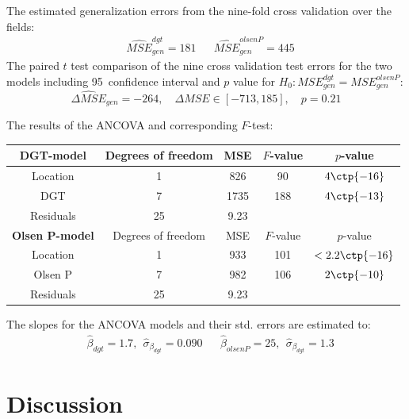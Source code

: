 \documentclass[11pt,fleqn]{article}
\begin{document}
The estimated generalization errors from the nine-fold cross validation over the fields:
\begin{align*}
	& \widehat {MSE}_{gen} ^{dgt} = 181
	&& \widehat {MSE}_{gen} ^{olsenP} = 445
\end{align*}
The paired \(t\) test comparison of the nine cross validation test errors for the two models including 95\pro\ confidence interval and \(p\) value for \(H_0: {MSE}_{gen} ^{dgt}={MSE}_{gen} ^{olsenP}\):
\[
\widehat{\Delta MSE}_{gen} = -264, \quad \Delta MSE\in [-713, 185],\quad  p=0.21
\]



\noindent
The results of the ANCOVA and corresponding \(F\)-test:  
\begin{table}[H]
	\centering
	\begin{tabular}{c | c c c c}
	\textbf{DGT-model}  &Degrees of freedom & MSE&\(F\)-value&\(p\)-value\\
	\hline 
	Location  & 1& 826 & 90 & \(4\ctp{-16}\)\\
	DGT  & 7&1735 &  188 & \(4\ctp{-13}\)\\
	Residuals &25 &9.23 &\\
	\hline 
	\textbf{Olsen P-model} &Degrees of freedom & MSE&\(F\)-value&\(p\)-value\\
	\hline 
	Location & 1&933 & 101 & \(<2.2\ctp{-16}\)\\
	Olsen P &7 &982 & 106 & \(2 \ctp{-10}\)\\
	Residuals &25  &9.23
	\end{tabular}
\end{table}\noindent 
The slopes for the ANCOVA models and their std. errors are estimated to:
\begin{align*}
	&\hat \beta_{dgt}= 1.7,\ \ \hat \sigma_{\beta_{dgt}}=0.090
	&&\hat \beta_{olsenP}= 25,\ \ \hat \sigma_{\beta_{dgt}}=1.3
\end{align*}
\section{Discussion}
\end{document}
